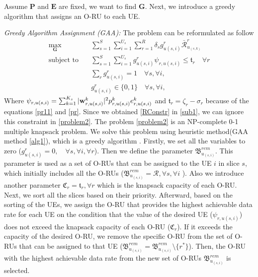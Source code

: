 \documentclass[lettersize,journal]{IEEEtran}
\begin{document}
Assume $\boldsymbol{P}$ and $\boldsymbol{E}$ are fixed, we want to find $\boldsymbol{G}$.
Next, we introduce a greedy algorithm that assigns an O-RU to each UE.

\textit{Greedy Algorithm Assignment (GAA):}
The problem can be reformulated as follow
\begin{subequations}\label{problem2}
\begin{alignat}{4}
\max\limits_{ \boldsymbol{G} }   \quad &  \sum_{s=1}^S\sum_{i=1}^{U_s}\sum_{r=1}^{R} \delta_s g^r_{u(s,i)}\bar{\mathcal{R}}^r_{u_{(s,k)}} \ \\
\text{subject to} \quad  & \sum_{s=1}^{S}\sum_{i=1}^{U_s} g_{u(s,i)}^r \psi_{r,u(s,i)}\leq \mathfrak{t}_r \quad \forall r
 \label{p11} \\
& \sum_{r}g^r_{u(s,i)} = 1  \quad \forall s,\forall i, \label{p12}\\
 & g^r_{u(s,i)} \in \{0,1\} \quad \forall s,\forall i, \label{p13}  
\end{alignat}
\end{subequations}
Where $ \psi_{r,u(s,i)}=\sum_{k=1}^{K_s}|\bold{w}_{r,u(s,i)}^{k}|^2 p_{r,u(s,i)}^{k}  e^k_{r,u(s,i)}$
and $\mathfrak{t}_r = \zeta_r- \sigma_r$  because of the equations \eqref{pr11} and \eqref{pr}.
Since we obtained \eqref{RConstr} in \eqref{sub1}, we can ignore this constraint in \eqref{problem2}.
The problem \eqref{problem2} is an NP-complete 0-1 multiple knapsack problem.  
We solve this problem using heuristic method(GAA method \ref{alg1}), which is a greedy algorithm \cite{akccay2007greedy,lee2018dynamic}.
Firstly, we set all the variables to zero ($g^r_{u(s,i)} = 0, \quad \forall s, \forall i, \forall r$). 
Then we define the parameter ${\mathfrak{B}}^{rem}_{u_{(s,i)}}$. This parameter is used as a set of O-RUs that can be assigned to the UE $i$ in slice $s$, which initially includes all the O-RUs (${\mathfrak{B}}^{rem}_{u_{(s,i)}} = \mathcal{R}, \forall s, \forall i$ ). 
Also we introduce another parameter $ \mathfrak{C}_r = \mathfrak{t}_r, \forall r$
which is the knapsack capacity of each O-RU.
Next, we sort all the slices based on their priority. 
Afterward, based on the sorting of the UEs,
we assign the O-RU that provides the highest achievable data rate for each UE on the condition that the value of the desired UE ($\psi_{r,u(s,i)}$) does not exceed the knapsack capacity of each O-RU ($ \mathfrak{C}_r$).
If it exceeds the capacity of the desired O-RU, we remove the specific O-RU from the set of O-RUs that can be assigned to that UE (${\mathfrak{B}}^{rem}_{u_{(s,i)}} = {\mathfrak{B}}^{rem}_{u_{(s,i)}} \setminus \{{r^*}\} $). Then, the O-RU with the highest achievable data rate from the new set of O-RUs ${\mathfrak{B}}^{rem}_{u_{(s,i)}}$ is selected. 
\end{document}

